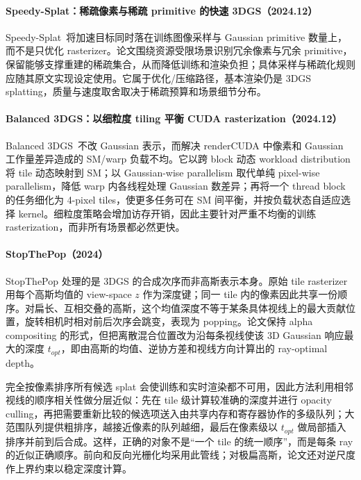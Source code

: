 \paragraph{Speedy-Splat：稀疏像素与稀疏 primitive 的快速 3DGS（2024.12）}
Speedy-Splat~\cite{2412_00578}将加速目标同时落在训练图像采样与 Gaussian primitive 数量上，而不是只优化 rasterizer。论文围绕资源受限场景识别冗余像素与冗余 primitive，保留能够支撑重建的稀疏集合，从而降低训练和渲染负担；具体采样与稀疏化规则应随其原文实现设定使用。它属于优化/压缩路径，基本渲染仍是 3DGS splatting，质量与速度取舍取决于稀疏预算和场景细节分布。


\paragraph{Balanced 3DGS：以细粒度 tiling 平衡 CUDA rasterization（2024.12）}
Balanced 3DGS~\cite{2412_17378}不改 Gaussian 表示，而解决 renderCUDA 中像素和 Gaussian 工作量差异造成的 SM/warp 负载不均。它以跨 block 动态 workload distribution 将 tile 动态映射到 SM；以 Gaussian-wise parallelism 取代单纯 pixel-wise parallelism，降低 warp 内各线程处理 Gaussian 数差异；再将一个 thread block 的任务细化为 4-pixel tiles，使更多任务可在 SM 间平衡，并按负载状态自适应选择 kernel。细粒度策略会增加访存开销，因此主要针对严重不均衡的训练 rasterization，而非所有场景都必然更快。


\paragraph{StopThePop（2024）\cite{2402_00525}}
StopThePop 处理的是 3DGS 的合成次序而非高斯表示本身。原始 tile rasterizer 用每个高斯均值的 view-space $z$ 作为深度键；同一 tile 内的像素因此共享一份顺序。对扁长、互相交叠的高斯，这个均值深度不等于某条具体视线上的最大贡献位置，旋转相机时相对前后次序会跳变，表现为 popping。论文保持 alpha compositing 的形式，但把离散混合位置改为沿每条视线使该 3D Gaussian 响应最大的深度 $t_{opt}$，即由高斯的均值、逆协方差和视线方向计算出的 ray-optimal depth。

完全按像素排序所有候选 splat 会使训练和实时渲染都不可用，因此方法利用相邻视线的顺序相关性做分层近似：先在 tile 级计算较准确的深度并进行 opacity culling，再把需要重新比较的候选项送入由共享内存和寄存器协作的多级队列；大范围队列提供粗排序，越接近像素的队列越细，最后在像素级以 $t_{opt}$ 做局部插入排序并前到后合成。这样，正确的对象不是“一个 tile 的统一顺序”，而是每条 ray 的近似正确顺序。前向和反向光栅化均采用此管线；对极扁高斯，论文还对逆尺度作上界约束以稳定深度计算。

